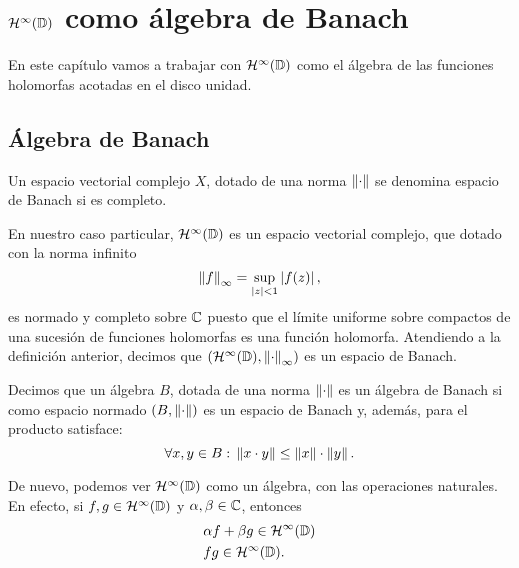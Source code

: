 \chapter{$\mathcal{H}^{\infty}(\mathbb{D})$ como álgebra de Banach}
\label{cap:banach}

En este capítulo vamos a trabajar con $\mathcal{H}^{\infty}(\mathbb{D})$ como el álgebra de las funciones holomorfas acotadas en el disco unidad. \\

\section{Álgebra de Banach}

\begin{definition}
    Un espacio vectorial complejo $X$, dotado de una norma $\left\lVert\cdot\right\rVert$ se denomina espacio de Banach si es completo.
\end{definition}
\bigskip

En nuestro caso particular, $\mathcal{H}^{\infty}(\mathbb{D})$ es un espacio vectorial complejo, que dotado con la norma infinito
\begin{equation*}
    \left\lVert f\right\rVert_{\infty} = \sup_{\left\lvert z\right\rvert < 1} \left\lvert f(z)\right\rvert,
\end{equation*}
es normado y completo sobre $\mathbb{C}$ puesto que el límite uniforme sobre compactos de una sucesión de funciones holomorfas es una función holomorfa. Atendiendo a la definición anterior, decimos que  $(\mathcal{H}^{\infty}(\mathbb{D}), \left\lVert\cdot\right\rVert_{\infty})$ es un espacio de Banach. \\

\begin{definition}
    Decimos que un álgebra $B$, dotada de una norma $\left\lVert\cdot\right\rVert$ es un álgebra de Banach si como espacio normado $(B, \left\lVert\cdot\right\rVert)$ es un espacio de Banach y, además, para el producto satisface:
    \begin{equation*}
        \forall x, y \in B: \, \left\lVert x \cdot y\right\rVert \leq \left\lVert x\right\rVert \cdot \left\lVert y\right\rVert.
    \end{equation*}
\end{definition}
\bigskip

De nuevo, podemos ver $\mathcal{H}^{\infty}(\mathbb{D})$ como un álgebra, con las operaciones naturales. En efecto, si $f, g \in \mathcal{H}^{\infty}(\mathbb{D})$ y $\alpha, \beta \in \mathbb{C}$, entonces
\begin{equation*}
    \begin{split}
        & \alpha f + \beta g \in \mathcal{H}^{\infty}(\mathbb{D}) \\
        & fg \in \mathcal{H}^{\infty}(\mathbb{D}).
    \end{split}
\end{equation*} \\

